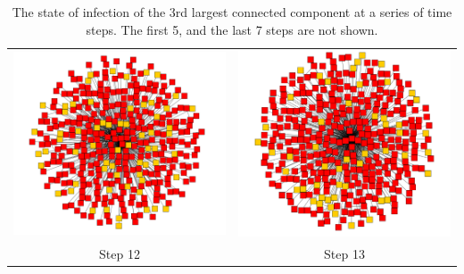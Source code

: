 \documentclass[12pt, oneside, openany]{article} %
\newcommand\Bstrut{\rule[-0.9ex]{0pt}{0pt}} %
\begin{document}
\begin{table}[p]
\begin{tabular}{| c | c |}
  	\includegraphics[scale=0.11]{comp12.png} & \includegraphics[scale=0.11]{comp13.png}  \\
	Step 12 & Step 13 \Bstrut \\
	\hline
\end{tabular}
  \caption{The state of infection of the 3rd largest connected component at a series of time steps. The first 5, and the last 7 steps are not shown.}
  \label{tbl:series}
\end{table}
\end{document}
